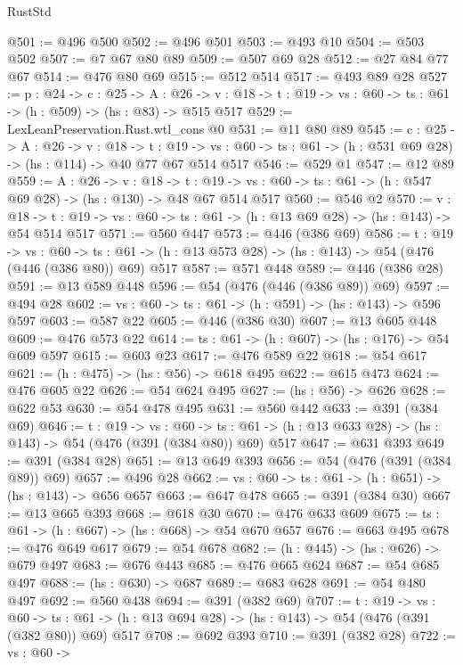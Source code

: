 \begin{lexlean}{RustStd}
\begin{coremodule}
@501 := @496 @500
@502 := @496 @501
@503 := @493 @10
@504 := @503 @502
@507 := @7 @67 @80 @89
@509 := @507 @69 @28
@512 := @27 @84 @77 @67
@514 := @476 @80 @69
@515 := @512 @514
@517 := @493 @89 @28
@527 := {p : @24} ->
  {c : @25} ->
  {A : @26} ->
  {v : @18} -> {t : @19} -> {vs : @60} -> {ts : @61} -> (h : @509) -> (hs : @83) -> @515 @517
@529 := LexLeanPreservation.Rust.wtl_cons @0
@531 := @11 @80 @89
@545 := {c : @25} ->
  {A : @26} ->
  {v : @18} ->
  {t : @19} ->
  {vs : @60} -> {ts : @61} -> (h : @531 @69 @28) -> (hs : @114) -> @40 @77 @67 @514 @517
@546 := @529 @1
@547 := @12 @89
@559 := {A : @26} ->
  {v : @18} ->
  {t : @19} -> {vs : @60} -> {ts : @61} -> (h : @547 @69 @28) -> (hs : @130) -> @48 @67 @514 @517
@560 := @546 @2
@570 := {v : @18} ->
  {t : @19} -> {vs : @60} -> {ts : @61} -> (h : @13 @69 @28) -> (hs : @143) -> @54 @514 @517
@571 := @560 @447
@573 := @446 (@386 @69)
@586 := {t : @19} ->
  {vs : @60} ->
  {ts : @61} -> (h : @13 @573 @28) -> (hs : @143) -> @54 (@476 (@446 (@386 @80)) @69) @517
@587 := @571 @448
@589 := @446 (@386 @28)
@591 := @13 @589 @448
@596 := @54 (@476 (@446 (@386 @89)) @69)
@597 := @494 @28
@602 := {vs : @60} -> {ts : @61} -> (h : @591) -> (hs : @143) -> @596 @597
@603 := @587 @22
@605 := @446 (@386 @30)
@607 := @13 @605 @448
@609 := @476 @573 @22
@614 := {ts : @61} -> (h : @607) -> (hs : @176) -> @54 @609 @597
@615 := @603 @23
@617 := @476 @589 @22
@618 := @54 @617
@621 := (h : @475) -> (hs : @56) -> @618 @495
@622 := @615 @473
@624 := @476 @605 @22
@626 := @54 @624 @495
@627 := (hs : @56) -> @626
@628 := @622 @53
@630 := @54 @478 @495
@631 := @560 @442
@633 := @391 (@384 @69)
@646 := {t : @19} ->
  {vs : @60} ->
  {ts : @61} -> (h : @13 @633 @28) -> (hs : @143) -> @54 (@476 (@391 (@384 @80)) @69) @517
@647 := @631 @393
@649 := @391 (@384 @28)
@651 := @13 @649 @393
@656 := @54 (@476 (@391 (@384 @89)) @69)
@657 := @496 @28
@662 := {vs : @60} -> {ts : @61} -> (h : @651) -> (hs : @143) -> @656 @657
@663 := @647 @478
@665 := @391 (@384 @30)
@667 := @13 @665 @393
@668 := @618 @30
@670 := @476 @633 @609
@675 := {ts : @61} -> (h : @667) -> (hs : @668) -> @54 @670 @657
@676 := @663 @495
@678 := @476 @649 @617
@679 := @54 @678
@682 := (h : @445) -> (hs : @626) -> @679 @497
@683 := @676 @443
@685 := @476 @665 @624
@687 := @54 @685 @497
@688 := (hs : @630) -> @687
@689 := @683 @628
@691 := @54 @480 @497
@692 := @560 @438
@694 := @391 (@382 @69)
@707 := {t : @19} ->
  {vs : @60} ->
  {ts : @61} -> (h : @13 @694 @28) -> (hs : @143) -> @54 (@476 (@391 (@382 @80)) @69) @517
@708 := @692 @393
@710 := @391 (@382 @28)
@722 := {vs : @60} ->

\end{coremodule}
\end{lexlean}
